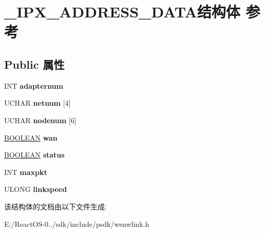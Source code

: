 \hypertarget{struct___i_p_x___a_d_d_r_e_s_s___d_a_t_a}{}\section{\+\_\+\+I\+P\+X\+\_\+\+A\+D\+D\+R\+E\+S\+S\+\_\+\+D\+A\+T\+A结构体 参考}
\label{struct___i_p_x___a_d_d_r_e_s_s___d_a_t_a}
\subsection*{Public 属性}
\begin{DoxyCompactItemize}
\item 
\mbox{\label{struct___i_p_x___a_d_d_r_e_s_s___d_a_t_a_adce645c757e7916fe37f7f336e7f3a3b}} 
I\+NT {\bfseries adapternum}
\item 
\mbox{\label{struct___i_p_x___a_d_d_r_e_s_s___d_a_t_a_ac9e81686b244056650757dcc4ff807e5}} 
U\+C\+H\+AR {\bfseries netnum} \mbox{[}4\mbox{]}
\item 
\mbox{\label{struct___i_p_x___a_d_d_r_e_s_s___d_a_t_a_ad8c4d918c81cdafe5818f9b8dd96d211}} 
U\+C\+H\+AR {\bfseries nodenum} \mbox{[}6\mbox{]}
\item 
\mbox{\label{struct___i_p_x___a_d_d_r_e_s_s___d_a_t_a_aeace2eb9dbfdc2a53289cf0b34f4a770}} 
\hyperlink{_processor_bind_8h_a112e3146cb38b6ee95e64d85842e380a}{B\+O\+O\+L\+E\+AN} {\bfseries wan}
\item 
\mbox{\label{struct___i_p_x___a_d_d_r_e_s_s___d_a_t_a_a639682157f5e00e2de43b026370c177c}} 
\hyperlink{_processor_bind_8h_a112e3146cb38b6ee95e64d85842e380a}{B\+O\+O\+L\+E\+AN} {\bfseries status}
\item 
\mbox{\label{struct___i_p_x___a_d_d_r_e_s_s___d_a_t_a_a8bf5e809d819bef3703a403b89e6b86a}} 
I\+NT {\bfseries maxpkt}
\item 
\mbox{\label{struct___i_p_x___a_d_d_r_e_s_s___d_a_t_a_aadd9b7c36d645bf24ee0942c65dfbfad}} 
U\+L\+O\+NG {\bfseries linkspeed}
\end{DoxyCompactItemize}


该结构体的文档由以下文件生成\+:\begin{DoxyCompactItemize}
\item 
E\+:/\+React\+O\+S-\/0../sdk/include/psdk/wsnwlink.\+h\end{DoxyCompactItemize}
